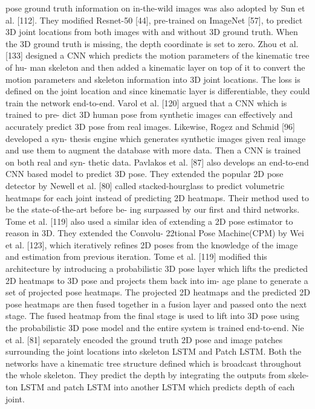 pose ground truth information on in-the-wild images was also adopted by Sun et
al. [112]. They modified Resnet-50 [44], pre-trained on ImageNet [57], to predict
3D joint locations from both images with and without 3D ground truth. When the
3D ground truth is missing, the depth coordinate is set to zero. Zhou et al. [133]
designed a CNN which predicts the motion parameters of the kinematic tree of hu-
man skeleton and then added a kinematic layer on top of it to convert the motion
parameters and skeleton information into 3D joint locations. The loss is defined on
the joint location and since kinematic layer is differentiable, they could train the
network end-to-end. Varol et al. [120] argued that a CNN which is trained to pre-
dict 3D human pose from synthetic images can effectively and accurately predict
3D pose from real images. Likewise, Rogez and Schmid [96] developed a syn-
thesis engine which generates synthetic images given real image and use them to
augment the database with more data. Then a CNN is trained on both real and syn-
thetic data. Pavlakos et al. [87] also develops an end-to-end CNN based model to
predict 3D pose. They extended the popular 2D pose detector by Newell et al. [80]
called stacked-hourglass to predict volumetric heatmaps for each joint instead of
predicting 2D heatmaps. Their method used to be the state-of-the-art before be-
ing surpassed by our first and third networks. Tome et al. [119] also used a similar
idea of extending a 2D pose estimator to reason in 3D. They extended the Convolu-
22tional Pose Machine(CPM) by Wei et al. [123], which iteratively refines 2D poses
from the knowledge of the image and estimation from previous iteration. Tome et
al. [119] modified this architecture by introducing a probabilistic 3D pose layer
which lifts the predicted 2D heatmaps to 3D pose and projects them back into im-
age plane to generate a set of projected pose heatmaps. The projected 2D heatmaps
and the predicted 2D pose heatmaps are then fused together in a fusion layer and
passed onto the next stage. The fused heatmap from the final stage is used to lift
into 3D pose using the probabilistic 3D pose model and the entire system is trained
end-to-end. Nie et al. [81] separately encoded the ground truth 2D pose and image
patches surrounding the joint locations into skeleton LSTM and Patch LSTM. Both
the networks have a kinematic tree structure defined which is broadcast throughout
the whole skeleton. They predict the depth by integrating the outputs from skele-
ton LSTM and patch LSTM into another LSTM which predicts depth of each joint.
